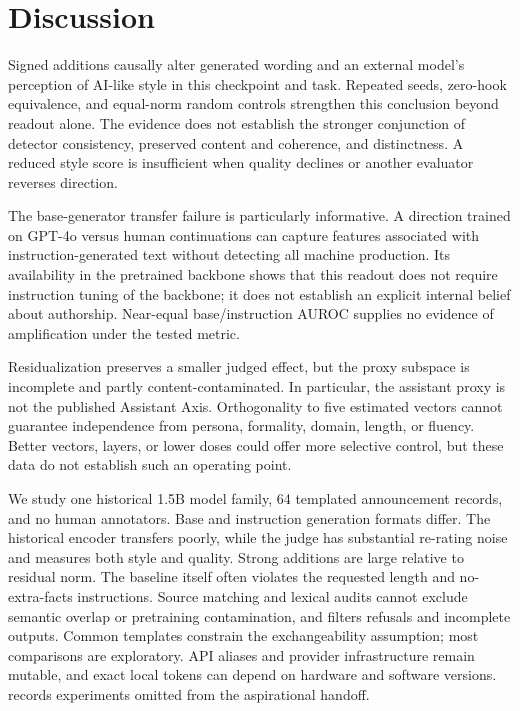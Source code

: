 \section{Discussion}\label{sec:discussion}
Signed additions causally alter generated wording and an external model's perception of AI-like style in this checkpoint and task. Repeated seeds, zero-hook equivalence, and equal-norm random controls strengthen this conclusion beyond readout alone. The evidence does not establish the stronger conjunction of detector consistency, preserved content and coherence, and distinctness. A reduced style score is insufficient when quality declines or another evaluator reverses direction.

The base-generator transfer failure is particularly informative. A direction trained on GPT-4o versus human continuations can capture features associated with instruction-generated text without detecting all machine production. Its availability in the pretrained backbone shows that this readout does not require instruction tuning of the backbone; it does not establish an explicit internal belief about authorship. Near-equal base/instruction AUROC supplies no evidence of amplification under the tested metric.

Residualization preserves a smaller judged effect, but the proxy subspace is incomplete and partly content-contaminated. In particular, the assistant proxy is not the published Assistant Axis. Orthogonality to five estimated vectors cannot guarantee independence from persona, formality, domain, length, or fluency. Better vectors, layers, or lower doses could offer more selective control, but these data do not establish such an operating point.

We study one historical 1.5B model family, 64 templated announcement records, and no human annotators. Base and instruction generation formats differ. The historical encoder transfers poorly, while the judge has substantial re-rating noise and measures both style and quality. Strong additions are large relative to residual norm. The baseline itself often violates the requested length and no-extra-facts instructions. Source matching and lexical audits cannot exclude semantic overlap or pretraining contamination, and \hape filters refusals and incomplete outputs. Common templates constrain the exchangeability assumption; most comparisons are exploratory. API aliases and provider infrastructure remain mutable, and exact local tokens can depend on hardware and software versions.  records experiments omitted from the aspirational handoff.

